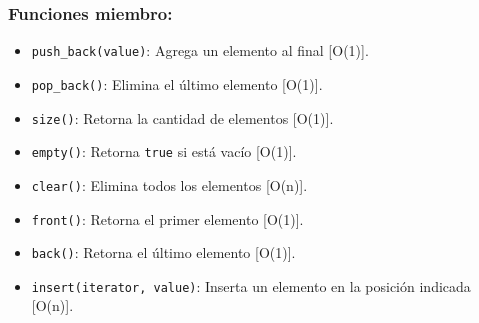 \subsubsection{Funciones miembro:}
\begin{itemize}
  \item \texttt{push\_back(value)}: Agrega un elemento al final [O(1)].
  \item \texttt{pop\_back()}: Elimina el último elemento [O(1)].
  \item \texttt{size()}: Retorna la cantidad de elementos [O(1)].
  \item \texttt{empty()}: Retorna \texttt{true} si está vacío [O(1)].
  \item \texttt{clear()}: Elimina todos los elementos [O(n)].
  \item \texttt{front()}: Retorna el primer elemento [O(1)].
  \item \texttt{back()}: Retorna el último elemento [O(1)].
  \item \texttt{insert(iterator, value)}: Inserta un elemento en la posición indicada [O(n)].
\end{itemize}
